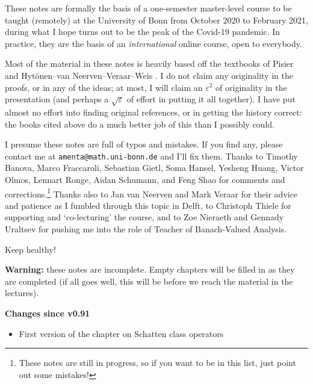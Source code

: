 These notes are formally the basis of a one-semester master-level course to be taught (remotely) at the University of Bonn from October 2020 to February 2021, during what I hope turns out to be the peak of the Covid-19 pandemic.
In practice, they are the basis of an \emph{international} online course, open to everybody.

Most of the material in these notes is heavily based off the textbooks of Pisier \cite{gP16} and Hyt\"onen--van Neerven--Veraar--Weis \cite{HNVW16, HNVW17}.
I do not claim any originality in the proofs, or in any of the ideas; at most, I will claim an $\varepsilon^2$ of originality in the presentation (and perhaps a $\sqrt{\varepsilon}$ of effort in putting it all together).
I have put almost no effort into finding original references, or in getting the history correct: the books cited above do a much better job of this than I possibly could.

\vspace{1cm}

I presume these notes are full of typos and mistakes.
If you find any, please contact me at \texttt{amenta@math.uni-bonn.de} and I'll fix them.
Thanks to Timothy Banova, Marco Fraccaroli, Sebastian Gietl, Soma Hansel, Yesheng Huang, Victor Olmos, Lennart Ronge, Aidan Schumann, and Feng Shao for comments and corrections.\footnote{These notes are still in progress, so if you want to be in this list, just point out some mistakes!}
Thanks also to Jan van Neerven and Mark Veraar for their advice and patience as I fumbled through this topic in Delft, to Christoph Thiele for supporting and `co-lecturing' the course, and to Zoe Nieraeth and Gennady Uraltsev for pushing me into the role of Teacher of Banach-Valued Analysis.

\vspace{0.5cm}

Keep healthy! 




\vspace{1cm}

\textbf{Warning:} these notes are incomplete.
Empty chapters will be filled in as they are completed (if all goes well, this will be before we reach the material in the lectures).

\textbf{Changes since v0.91}
\begin{itemize}
\item First version of the chapter on Schatten class operators
\end{itemize}

